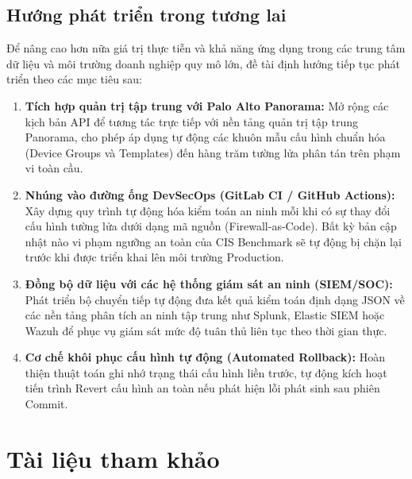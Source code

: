 \documentclass[12pt,a4paper]{article}
\begin{document}
\subsection{Hướng phát triển trong tương lai}
\noindent Để nâng cao hơn nữa giá trị thực tiễn và khả năng ứng dụng trong các trung tâm dữ liệu và môi trường doanh nghiệp quy mô lớn, đề tài định hướng tiếp tục phát triển theo các mục tiêu sau:
\begin{enumerate}
    \item \textbf{Tích hợp quản trị tập trung với Palo Alto Panorama:} Mở rộng các kịch bản API để tương tác trực tiếp với nền tảng quản trị tập trung Panorama, cho phép áp dụng tự động các khuôn mẫu cấu hình chuẩn hóa (Device Groups và Templates) đến hàng trăm tường lửa phân tán trên phạm vi toàn cầu.
    \item \textbf{Nhúng vào đường ống DevSecOps (GitLab CI / GitHub Actions):} Xây dựng quy trình tự động hóa kiểm toán an ninh mỗi khi có sự thay đổi cấu hình tường lửa dưới dạng mã nguồn (Firewall-as-Code). Bất kỳ bản cập nhật nào vi phạm ngưỡng an toàn của CIS Benchmark sẽ tự động bị chặn lại trước khi được triển khai lên môi trường Production.
    \item \textbf{Đồng bộ dữ liệu với các hệ thống giám sát an ninh (SIEM/SOC):} Phát triển bộ chuyển tiếp tự động đưa kết quả kiểm toán định dạng JSON về các nền tảng phân tích an ninh tập trung như Splunk, Elastic SIEM hoặc Wazuh để phục vụ giám sát mức độ tuân thủ liên tục theo thời gian thực.
    \item \textbf{Cơ chế khôi phục cấu hình tự động (Automated Rollback):} Hoàn thiện thuật toán ghi nhớ trạng thái cấu hình liền trước, tự động kích hoạt tiến trình Revert cấu hình an toàn nếu phát hiện lỗi phát sinh sau phiên Commit.
\end{enumerate}


\clearpage
\section*{Tài liệu tham khảo}
\end{document}
